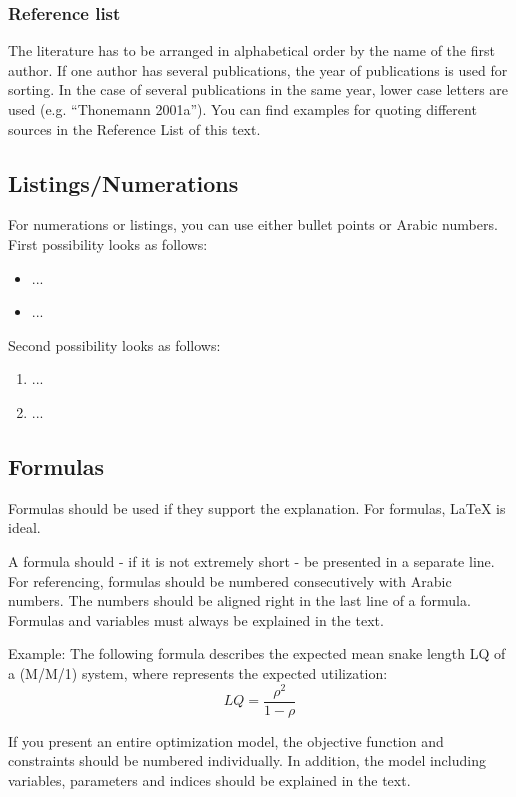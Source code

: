 \documentclass[a4paper,12pt, titlepage]{article}
\begin{document}
\subsubsection{Reference list}\label{2.6.2}
The literature has to be arranged in alphabetical order by the name of the first author. If one author has several publications, the year of publications is used for sorting. In the case of several publications in the same year, lower case letters are used (e.g. “Thonemann 2001a”). You can find examples for quoting different sources in the Reference List of this text.

\subsection{Listings/Numerations}\label{2.7}
For numerations or listings, you can use either bullet points or Arabic numbers.
First possibility looks as follows:
\begin{itemize}
    \item ...
    \item ...
\end{itemize}
Second possibility looks as follows:
\begin{enumerate}
    \item ...
    \item ...
\end{enumerate}

\subsection{Formulas}\label{2.8}
Formulas should be used if they support the explanation. For formulas, LaTeX is ideal. \par
A formula should - if it is not extremely short - be presented in a separate line. For referencing, formulas should be numbered consecutively with Arabic numbers. The numbers should be aligned right in the last line of a formula. Formulas and variables must always be explained in the text. \par

Example: The following formula describes the expected mean snake length LQ of a (M/M/1) system, where represents the expected utilization:
\begin{equation}
       LQ=  \frac{\rho^2}{1-\rho} 
\end{equation}


 
If you present an entire optimization model, the objective function and constraints should be numbered individually. In addition, the model including variables, parameters and indices should be explained in the text.
\end{document}
